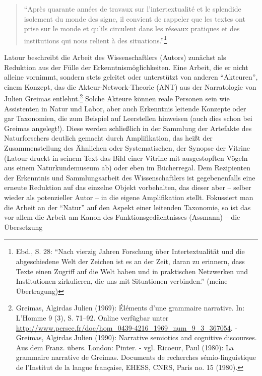 \begin{quote}
\enquote{Après quarante années de travaux sur l'intertextualité et le
splendide isolement du monde des signe, il convient de rappeler que les
textes ont prise sur le monde et qu'ils circulent dans les réseaux
pratiques et des institutions qui nous relient à des
situations.}\footnote{Ebd., S. 28: \enquote{Nach vierzig Jahren
  Forschung über Intertextualität und die abgeschiedene Welt der Zeichen
  ist es an der Zeit, daran zu erinnern, dass Texte einen Zugriff auf
  die Welt haben und in praktischen Netzwerken und Institutionen
  zirkulieren, die uns mit Situationen verbinden.} (meine Übertragung)}
\end{quote}

Latour beschreibt die Arbeit des Wissenschaftlers (Autors) zunächst als
Reduktion aus der Fülle der Erkenntnismöglichkeiten. Eine Arbeit, die er
nicht alleine vornimmt, sondern stets geleitet oder unterstützt von
anderen \enquote{Akteuren}, einem Konzept, das die
Akteur-Network-Theorie (ANT) aus der Narratologie von Julien Greimas
entlehnt.\footnote{Greimas, Algirdas Julien (1969): Éléments d'une
  grammaire narrative. In: L'Homme 9 (3), S. 71--92. Online verfügbar
  unter
  \url{http://www.persee.fr/doc/hom_0439-4216_1969_num_9_3_367054}. -
  Greimas, Algirdas Julien (1990): Narrative semiotics and cognitive
  discourses. Aus dem Franz. übers. London: Pinter. - vgl. Ricoeur, Paul
  (1980): La grammaire narrative de Greimas. Documents de recherches
  sémio-linguistique de l'Institut de la langue française, EHESS, CNRS,
  Paris no. 15 (1980).} Solche Akteure können reale Personen sein wie
Assistenten in Natur und Labor, aber auch Erkenntnis leitende Konzepte
oder gar Taxonomien, die zum Beispiel auf Leerstellen hinweisen (auch
dies schon bei Greimas angelegt!). Diese werden schließlich in der
Sammlung der Artefakte des Naturforschers deutlich gemacht durch
Amplifikation, das heißt der Zusammenstellung des Ähnlichen oder
Systematischen, der Synopse der Vitrine (Latour druckt in seinem Text
das Bild einer Vitrine mit ausgestopften Vögeln aus einem
Naturkundemuseum ab) oder eben im Bücherregal. Dem Rezipienten der
Erkenntnis und Sammlungsarbeit des Wissenschaftlers ist gegebenenfalls
eine erneute Reduktion auf das einzelne Objekt vorbehalten, das dieser
aber -- selber wieder als potenzieller Autor -- in die eigene
Amplifikation stellt. Fokussiert man die Arbeit an der \enquote{Natur}
auf den Aspekt einer leitenden Taxonomie, so ist das vor allem die
Arbeit am Kanon des Funktionsgedächtnisses (Assmann) -- die Übersetzung

